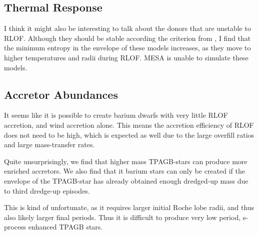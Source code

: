 \documentclass[a4paper,10pt]{article}
\begin{document}
\subsection{Thermal Response}
I think it might also be interesting to talk about the donors that are unstable to RLOF.
Although they should be stable according the criterion from \citet{temmink2022}, I find that the minimum entropy in the envelope of these models increases, as they move to higher temperatures and radii during RLOF.
MESA is unable to simulate these models.

\begin{figure}[ht]
	\centering
\end{figure}

\begin{figure}[ht]
	\centering
\end{figure}

\subsection{Accretor Abundances}

It seems like it is possible to create barium dwarfs with very little RLOF accretion, and wind accretion alone.
This means
the accretion efficiency of RLOF does not need to be high, which is expected as well due to the large overfill ratios and large mass-transfer rates.

Quite unsurprisingly, we find that higher mass TPAGB-stars can produce more enriched accretors.
We also find that it barium stars can only be created
if the envelope of the TPAGB-star has already obtained enough dredged-up mass due to third dredge-up episodes.

This is kind of unfortunate, as it requires larger initial Roche lobe radii, and thus also likely larger final periods.
Thus it is difficult to produce very low period, s-process enhanced TPAGB stars.
\end{document}
